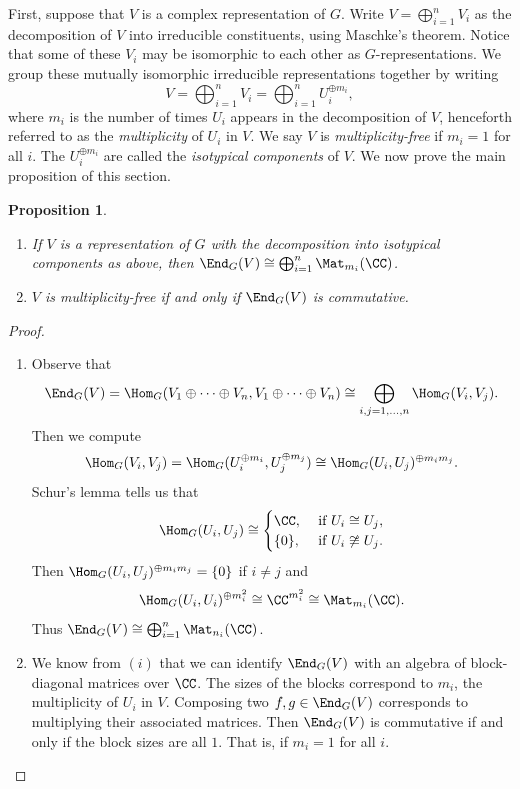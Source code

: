 \documentclass[11pt]{amsart}
\newtheorem{prop}[thm]{Proposition}
\theoremstyle{remark}
\begin{document}
First, suppose that $V$ is a complex representation of $G$.
Write $V = \bigoplus_{i=1}^n V_i$ as the decomposition of $V$ into irreducible constituents, using Maschke's theorem.
Notice that some of these $V_i$ may be isomorphic to each other as $G$-representations.
We group these mutually isomorphic irreducible representations together by writing
\[
	V = \bigoplus_{i=1}^n V_i = \bigoplus_{i=1}^n U_i^{\oplus m_i},
\]
where $m_i$ is the number of times $U_i$ appears in the decomposition of $V$, henceforth referred to as the \emph{multiplicity} of $U_i$ in $V$.
We say $V$ is \emph{multiplicity-free} if $m_i=1$ for all $i$.
The $U_i^{\oplus m_i}$ are called the \emph{isotypical components} of $V$.
We now prove the main proposition of this section.
\begin{prop}\label{prop: V_mult-free_iff_End_G(V)_commutative}
	\begin{enumerate}[\itshape(i)]
		\item If $V$ is a representation of $G$ with the decomposition into isotypical components as above, then $\End_G(V)\cong \bigoplus_{i=1}^n \Mat_{m_i}(\CC)$.
		\item $V$ is multiplicity-free if and only if $\End_G(V)$ is commutative.
	\end{enumerate}
\end{prop}
\begin{proof}
	\begin{enumerate}[\itshape(i)]
		\item Observe that
		      \[
			      \End_G(V) = \Hom_G(V_1\oplus \cdots \oplus V_n, V_1\oplus \cdots \oplus V_n) \cong \bigoplus_{i,j=1,\ldots,n} \Hom_G(V_i, V_j).
		      \]
		      Then we compute
		      \[
			      \Hom_G(V_i,V_j) = \Hom_G(U_i^{\oplus m_i}, U_j^{\oplus m_j}) \cong \Hom_G(U_i,U_j)^{\oplus m_im_j}.
		      \]
		      Schur's lemma tells us that
		      \[
			      \Hom_G(U_i,U_j) \cong \begin{cases}
				      \CC,\    & \text{if}\ U_i\cong U_j,     \\
				      \{0\},\  & \text{if}\ U_i\not\cong U_j.
			      \end{cases}
		      \]
		      Then $\Hom_G(U_i,U_j)^{\oplus m_im_j} =\{0\}$ if $i\neq j$ and
		      \[
			      \Hom_G(U_i,U_i)^{\oplus m_i^2} \cong \CC^{m_i^2} \cong \Mat_{m_i}(\CC).
		      \]
		      Thus $\End_G(V) \cong \bigoplus_{i=1}^n \Mat_{n_i}(\CC)$.

		\item We know from $(i)$ that we can identify $\End_G(V)$ with an algebra of block-diagonal matrices over $\CC$.
		      The sizes of the blocks correspond to $m_i$, the multiplicity of $U_i$ in $V$.
		      Composing two $f,g\in\End_G(V)$ corresponds to multiplying their associated matrices.
		      Then $\End_G(V)$ is commutative if and only if the block sizes are all $1$.
		      That is, if $m_i = 1$ for all $i$. \qedhere
	\end{enumerate}
\end{proof}
\end{document}
